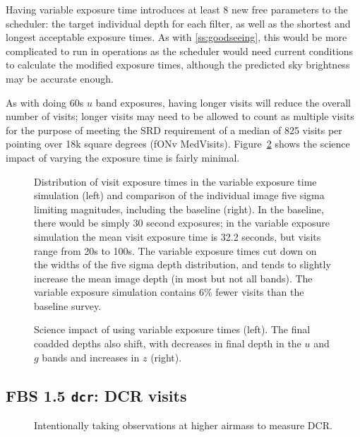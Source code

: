 Having variable exposure time introduces at least 8 new free parameters to the scheduler: the target individual depth for each filter, as well as the shortest and longest acceptable exposure times.  As with \ref{ss:goodseeing}, this would be more complicated to run in operations as the scheduler would need current conditions to calculate the modified exposure times, although the predicted sky brightness may be accurate enough.

As with doing 60s $u$ band exposures, having longer visits will reduce the overall number of visits; longer visits may need to be allowed to count as multiple visits for the purpose of meeting the SRD requirement of a median of 825 visits per pointing over 18k square degrees (fONv MedVisits). Figure~\ref{fig:var_radar} shows the science impact of varying the exposure time is fairly minimal. 

\begin{figure}
\caption{Distribution of visit exposure times in the variable exposure time simulation (left) and comparison of the individual image five sigma limiting magnitudes, including the baseline (right).  In the baseline, there would be simply 30 second exposures; in the variable exposure simulation the mean visit exposure time is 32.2 seconds, but visits range from 20s to 100s. The variable exposure times cut down on the widths of the five sigma depth distribution, and tends to slightly increase the mean image depth (in most but not all bands). The variable exposure simulation contains 6\% fewer visits than the baseline survey.}
\label{fig:varexpt_exptime}
\end{figure}

\begin{figure}
\caption{Science impact of using variable exposure times (left). The final coadded depths also shift, with decreases in final depth in the $u$ and $g$ bands and increases in $z$ (right).}\label{fig:var_radar}
\end{figure}


\subsection{FBS 1.5 {\tt dcr}: DCR visits}\label{ss:dcr}

\begin{figure}
\caption{Intentionally taking observations at higher airmass to measure DCR.}
\end{figure}

